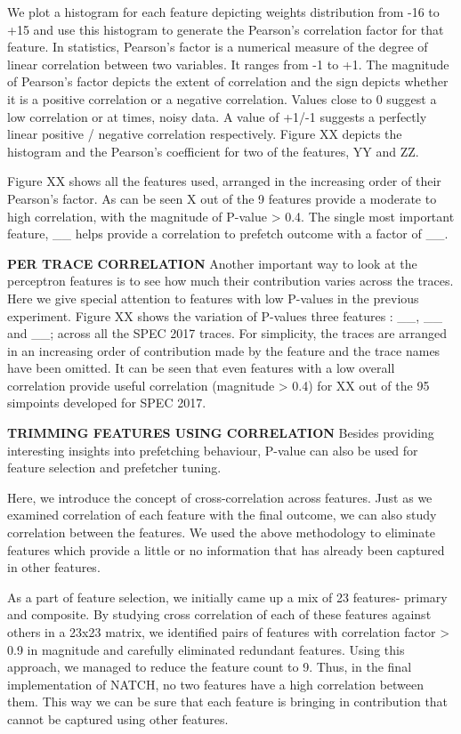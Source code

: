 We plot a histogram for each feature depicting weights distribution
from -16 to +15 and use this histogram to generate the Pearson's
correlation factor for that feature.  In statistics, Pearson's factor
is a numerical measure of the degree of linear correlation between two
variables.  It ranges from -1 to +1.  The magnitude of Pearson's
factor depicts the extent of correlation and the sign depicts whether
it is a positive correlation or a negative correlation.  Values close
to 0 suggest a low correlation or at times, noisy data.  A value of
+1/-1 suggests a perfectly linear positive / negative correlation
respectively.  Figure XX depicts the histogram and the Pearson's
coefficient for two of the features, YY and ZZ.

Figure XX shows all the features used, arranged in the increasing
order of their Pearson's factor.  As can be seen X out of the 9
features provide a moderate to high correlation, with the magnitude of
P-value > 0.4.  The single most important feature, \_\_ helps provide
a correlation to prefetch outcome with a factor of \_\_.

\textbf{PER TRACE CORRELATION} \newline Another important way to look
at the perceptron features is to see how much their contribution
varies across the traces.  Here we give special attention to features
with low P-values in the previous experiment.  Figure XX shows the
variation of P-values three features : \_\_, \_\_ and \_\_; across all
the SPEC 2017 traces.  For simplicity, the traces are arranged in an
increasing order of contribution made by the feature and the trace
names have been omitted.  It can be seen that even features with a low
overall correlation provide useful correlation (magnitude > 0.4) for
XX out of the 95 simpoints developed for SPEC 2017.  

\textbf{TRIMMING FEATURES USING CORRELATION} \newline Besides
providing interesting insights into prefetching behaviour, P-value can
also be used for feature selection and prefetcher tuning.

Here, we introduce the concept of cross-correlation across features.
Just as we examined correlation of each feature with the final
outcome, we can also study correlation between the features.  We used
the above methodology to eliminate features which provide a little or
no information that has already been captured in other features.

As a part of feature selection, we initially came up a mix of 23
features- primary and composite.  By studying cross correlation of
each of these features against others in a 23x23 matrix, we identified
pairs of features with correlation factor > 0.9 in magnitude and
carefully eliminated redundant features.  Using this approach, we
managed to reduce the feature count to 9.  Thus, in the final
implementation of NATCH, no two features have a high correlation
between them.  This way we can be sure that each feature is bringing
in contribution that cannot be captured using other features.

